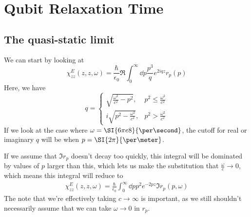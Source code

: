 \documentclass[../../main.tex]{subfiles}
\begin{document}
\section{Qubit Relaxation Time}

\subsection{The quasi-static limit}
We can start by looking at
\begin{equation}
	\chi_{zz}^{E}(z, z, \omega) = \frac{\hbar}{\epsilon_0}\Re\int_0^\infty \dd{p} \frac{p^3}{q} e^{2iqz}r_p(p)
\end{equation}
Here, we have
\begin{equation}
	q = \begin{cases}
			\sqrt{\frac{\omega^2}{c^2} - p^2}, & p^2 \le  \frac{\omega^2}{c^2} \\
			i \sqrt{p^2 - \frac{\omega^2}{c^2}}, & p^2 > \frac{\omega^2}{c^2}
		\end{cases}
\end{equation}
If we look at the case where $\omega = \SI{6\pi e8}{\per\second}$, the cutoff for real or imaginary $q$ will be when $p = \SI{2\pi}{\per\meter}$.

If we assume that $\Im r_p$ doesn't decay too quickly, this integral will be dominated by values of $p$ larger than this, which lets us make the substitution that $\frac{\omega}{c} \rightarrow 0$, which means this integral will reduce to
\begin{align}
	\chi_{zz}^{E}(z, z, \omega) = \frac{\hbar}{\epsilon_0}\int_0^\infty \dd{p} p^2 e^{-2pz}\Im r_p(p, \omega)
\end{align}
The note that we're effectively taking $c\rightarrow \infty$ is important, as we still shouldn't necessarily assume that we can take $\omega \rightarrow 0$ in $r_p$.
\end{document}
